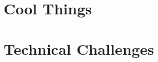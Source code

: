 \documentclass[12pt,letterpaper,titlepage]{article}
\begin{document}
\section{Cool Things}


\section{Technical Challenges}

\end{document}

